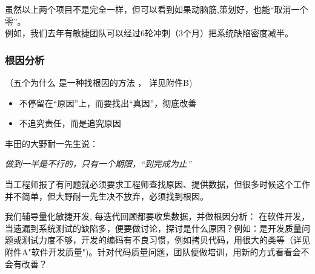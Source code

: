 

虽然以上两个项目不是完全一样，但可以看到如果动脑筋,策划好，也能``取消一个零''。\\
例如，我们去年有敏捷团队可以经过6轮冲刺（3个月）把系统缺陷密度减半。

\hypertarget{ux6839ux56e0ux5206ux6790}{%
\subsubsection{根因分析}\label{ux6839ux56e0ux5206ux6790}}

（五个为什么 是一种找根因的方法 ， 详见附件B)

\begin{itemize}
\tightlist
\item
  不停留在``原因''上，而要找出``真因''，彻底改善
\item
  不追究责任，而是追究原因\\
\end{itemize}

丰田的大野耐一先生说：

\begin{description}
\tightlist
\item[]
\emph{做到一半是不行的，只有一个期限，``到完成为止''}
\end{description}

当工程师报了有问题就必须要求工程师查找原因、提供数据，但很多时候这个工作并不简单，但大野耐一先生决不放弃，必须找到根因。

我们辅导量化敏捷开发, 每迭代回顾都要收集数据，并做根因分析：
在软件开发，当遗漏到系统测试的缺陷多，便要做讨论，探讨是什么原因？例如：是开发质量问题或测试力度不够，开发的编码有不良习惯，例如拷贝代码，用很大的类等（详见附件A"软件开发质量")。针对代码质量问题，团队便做培训，用新的方式看看会不会有改善？

